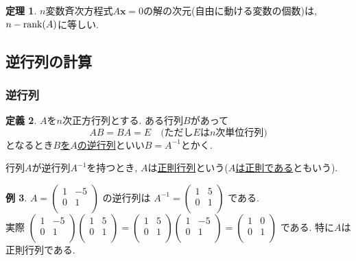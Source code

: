 \documentclass[dvipdfmx,a4paper,11pt]{article}
\theoremstyle{definition}
\newtheorem{thm}{定理}
\newtheorem{dfn}[thm]{定義}
\newtheorem{exa}[thm]{例}
\begin{document}
\begin{tcolorbox}[
    colback = white,
    colframe = green!35!black,
    fonttitle = \bfseries,
    breakable = true]
    \begin{thm}
    $n$変数斉次方程式$A\bm{x}=0$の解の次元(自由に動ける変数の個数)は, $n - {\rm rank}(A)$に等しい. 
  \end{thm}
 \end{tcolorbox}


\subsection{逆行列の計算 \cite[2.5節]{M}}
\subsubsection{逆行列}
\begin{tcolorbox}[
    colback = white,
    colframe = green!35!black,
    fonttitle = \bfseries,
    breakable = true]
    \begin{dfn}
    \label{dfn-regular}
$A$を$n$次正方行列とする.
 ある行列$B$があって
 $$
 AB =BA =E \quad \text{(ただし$E$は$n$次単位行列)}
 $$
 となるとき\underline{$B$を$A$の逆行列}といい$B=A^{-1}$とかく.
 
 行列$A$が逆行列$A^{-1}$を持つとき, $A$は\underline{正則行列}という(\underline{$A$は正則である}ともいう).
  \end{dfn}
 \end{tcolorbox}
 
 \begin{exa}
 $A=
  \begin{pmatrix}
 1& -5  \\
 0& 1  \\
 \end{pmatrix} 
 $
 の逆行列は
  $A^{-1}=
  \begin{pmatrix}
 1& 5  \\
 0& 1  \\
 \end{pmatrix} 
 $
 である. \\ 
 実際
  $
  \begin{pmatrix}
 1& -5  \\
 0& 1  \\
 \end{pmatrix} 
  \begin{pmatrix}
 1& 5  \\
 0& 1  \\
 \end{pmatrix} 
=
  \begin{pmatrix}
 1& 5  \\
 0& 1  \\
 \end{pmatrix} 
   \begin{pmatrix}
 1& -5  \\
 0& 1  \\
 \end{pmatrix} 
 =
   \begin{pmatrix}
 1& 0 \\
 0& 1  \\
 \end{pmatrix} 
 $
 である.
 特に$A$は正則行列である. 
 \end{exa}
\end{document}
